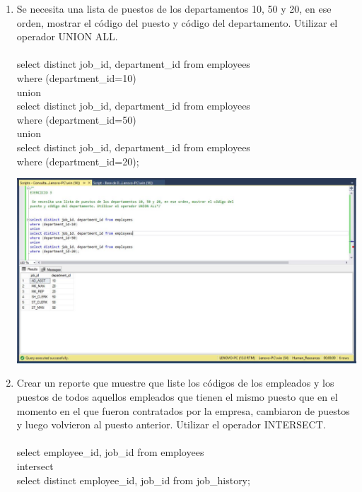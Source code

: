 \begin{enumerate}[1.]
	\item Se necesita una lista de puestos de los departamentos 10, 50 y 20, en ese orden, mostrar el c\'odigo del puesto y c\'odigo del departamento. Utilizar el operador UNION ALL.
	\\
	\\select distinct job\_id, department\_id from employees
	\\where (department\_id=10) 	
	\\union
	\\select distinct job\_id, department\_id from employees
	\\where (department\_id=50)
	\\union
	\\select distinct job\_id, department\_id from employees
	\\where  (department\_id=20);

	\begin{center}
	\includegraphics[width=17cm]{./Imagenes/Actividad10-Ejercicio03} 
	\end{center}

	\item Crear un reporte que muestre que liste los c\'odigos de los empleados y los puestos de todos aquellos empleados que tienen el mismo puesto que en el momento en el que fueron contratados por la empresa, cambiaron de puestos y luego volvieron al puesto anterior. Utilizar el operador INTERSECT.
	\\
	\\select employee\_id, job\_id from employees
	\\intersect
	\\select distinct employee\_id, job\_id from job\_history;


\end{enumerate}
